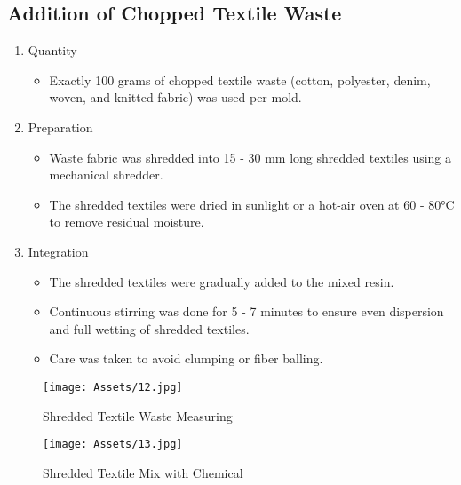 \subsection{Addition of Chopped Textile Waste }
\begin{enumerate}
    \item  Quantity
    \begin{itemize}
        \item Exactly 100 grams of chopped textile waste (cotton, polyester, denim, woven, and knitted fabric) was used per mold. 
    \end{itemize}
    \item Preparation
    \begin{itemize}
        \item Waste fabric was shredded into 15 - 30 mm long shredded textiles using a mechanical shredder.  
        \item The shredded textiles were dried in sunlight or a hot-air oven at 60 - 80°C to remove residual moisture. 
    \end{itemize}
    \item  Integration
    \begin{itemize}
        \item The shredded textiles were gradually added to the mixed resin. 
        \item Continuous stirring was done for 5 - 7 minutes to ensure even dispersion and full wetting of shredded textiles. 
        \item Care was taken to avoid clumping or fiber balling. 
    \end{itemize}
\end{enumerate}

\begin{figure}[H]
    \centering
    \begin{minipage}{0.48\textwidth}
    \centering
    \texttt{[image: Assets/12.jpg]}
    \caption{Shredded Textile Waste Measuring }
    \end{minipage}
    \hfill
    \begin{minipage}{0.48\textwidth}
    \centering
    \texttt{[image: Assets/13.jpg]}
    \caption{Shredded Textile Mix with Chemical }
    \end{minipage}
\end{figure}

\newpage{}

